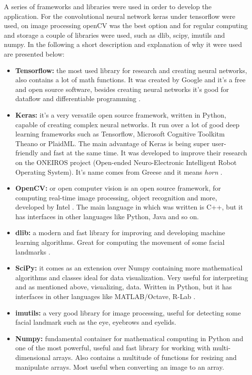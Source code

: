 A series of frameworks and libraries were used in order to develop the application. For the convolutional neural network keras under tensorflow were used, on image processing openCV was the best option and for regular computing and storage a couple of libraries were used, such as dlib, scipy, imutils and numpy. In the following a short description and explanation of why it were used are presented below: 
\begin{itemize}
    \item \textbf{Tensorflow:} the most used library for research and creating neural networks, also contains a lot of math functions. It was created by Google and it's a free and open source software, besides creating neural networks it's good for dataflow and  differentiable programming \cite{Tensorflow}.
    \item \textbf{Keras:} it's a very versatile open source framework, written in Python, capable of creating complex neural networks. It run over a lot of good deep learning frameworks such as Tensorflow, Microsoft Cognitive Toolkitm Theano or PlaidML. The main advantage of Keras is being super user-friendly and fast at the same time. It was developed to improve their research on the ONEIROS project (Open-ended Neuro-Electronic Intelligent Robot Operating System). It's name comes from Greese and it means \textit{horn}  \cite{KerasDoc, KerasBack, KerasWhy}.
    \item \textbf{OpenCV:} or open computer vision is an open source framework, for computing real-time image processing, object recognition and more, developed by Intel \cite{OpenCV}. The main language in which was written is C++, but it has interfaces in other languages like Python, Java and so on.
    \item \textbf{dlib:} a modern and fast library for improving and developing machine learning algorithms. Great for computing the movement of some facial landmarks \cite{Dlib}.
    \item \textbf{SciPy:} it comes as an extension over Numpy containing more mathematical algorithms and classes ideal for data visualization. Very useful for interpreting and as mentioned above, visualizing, data. Written in Python, but it has interfaces in other languages like MATLAB/Octave, R-Lab \cite{SciPy}.  
    \item \textbf{imutils:} a very good library for image processing, useful for detecting some facial landmark such as the eye, eyebrows and eyelids.
    \item \textbf{Numpy:} fundamental container for mathematical computing in Python \cite{Numpy} and one of the most powerful, useful and fast library for working with multi-dimensional arrays. Also contains a multitude of functions for resizing and manipulate arrays. Most useful when converting an image to an array. 
\end{itemize}
